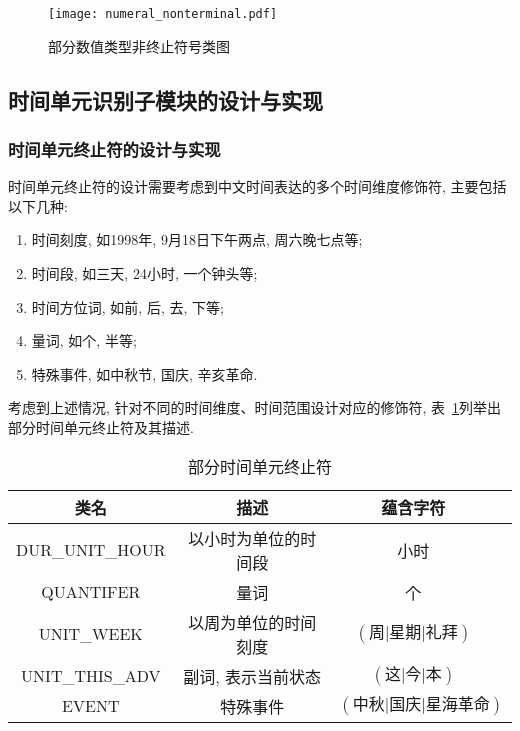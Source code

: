 \begin{figure}[h]
    \centering
    \texttt{[image: numeral\_nonterminal.pdf]}
    \caption{部分数值类型非终止符号类图}
    \label{fig:numeral_nonterminal}
\end{figure}

\subsection{时间单元识别子模块的设计与实现}

\subsubsection{时间单元终止符的设计与实现}

时间单元终止符的设计需要考虑到中文时间表达的多个时间维度修饰符, 主要包括以下几种:
\begin{enumerate}
    \item 时间刻度, 如1998年, 9月18日下午两点, 周六晚七点等;
    \item 时间段, 如三天, 24小时, 一个钟头等;
    \item 时间方位词, 如前, 后, 去, 下等;
    \item 量词, 如个, 半等;
    \item 特殊事件, 如中秋节, 国庆, 辛亥革命.
\end{enumerate}

考虑到上述情况, 针对不同的时间维度、时间范围设计对应的修饰符, 表~\ref{tab:date_terminal}列举出部分时间单元终止符及其描述.

\begin{table}[h]
    \centering
    \caption{部分时间单元终止符}
    \begin{tabular}{*{4}{c}}
        \toprule
        类名            & 描述                 & 蕴含字符                                 \\
        \midrule
        DUR\_UNIT\_HOUR & 以小时为单位的时间段 & 小时                                     \\
        QUANTIFER       & 量词                 & 个                                       \\
        UNIT\_WEEK      & 以周为单位的时间刻度 & $\left(\text{周|星期|礼拜}\right)$       \\
        UNIT\_THIS\_ADV & 副词, 表示当前状态   & $\left(\text{这|今|本}\right)$           \\
        EVENT           & 特殊事件             & $\left(\text{中秋|国庆|星海革命}\right)$ \\
        \bottomrule
    \end{tabular}
    \label{tab:date_terminal}
\end{table}

